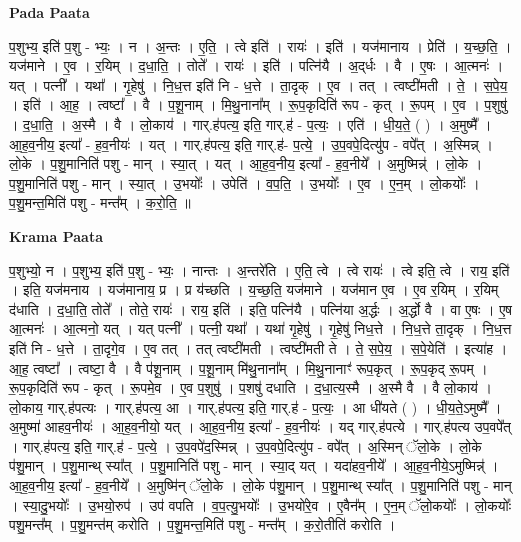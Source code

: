 \documentclass[17pt]{extarticle}
\begin{document}
\textbf{Pada Paata} \newline

प॒शुभ्य॒ इति॑ प॒शु - भ्यः॒ । न । अ॒न्तः । ए॒ति॒ । त्वे इति॑ । रायः॑ । इति॑ । यज॑मानाय । प्रेति॑ । य॒च्छ॒ति॒ । यज॑माने । ए॒व । र॒यिम् । द॒धा॒ति॒ । तोते᳚ । रायः॑ । इति॑ । पत्नि॑यै । अ॒द्‌र्धः । वै । ए॒षः । आ॒त्मनः॑ । यत् । पत्नी᳚ । यथा᳚ । गृ॒हेषु॑ । नि॒ध॒त्त इति॑ नि - ध॒त्ते । ता॒दृक् । ए॒व । तत् । त्वष्टी॑मती । ते॒ । स॒पे॒य॒ । इति॑ । आ॒ह॒ । त्वष्टा᳚ । वै । प॒शू॒नाम् । मि॒थु॒नाना᳚म् । रू॒प॒कृदिति॑ रूप - कृत् । रू॒पम् । ए॒व । प॒शुषु॑ । द॒धा॒ति॒ । अ॒स्मै । वै । लो॒काय॑ । गार्.ह॑पत्य॒ इति॒ गार्.ह॑ - प॒त्यः॒ । एति॑ । धी॒य॒ते॒ ( ) । अ॒मुष्मै᳚ । आ॒ह॒व॒नीय॒ इत्या᳚ - ह॒व॒नीयः॑ । यत् । गार्.ह॑पत्य॒ इति॒ गार्.ह॑- प॒त्ये॒ । उ॒प॒वपे॒दित्यु॑प - वपे᳚त् । अ॒स्मिन्न् । लो॒के । प॒शु॒मानिति॑ पशु - मान् । स्या॒त् । यत् । आ॒ह॒व॒नीय॒ इत्या᳚ - ह॒व॒नीये᳚ । अ॒मुष्मिन्न्॑ । लो॒के । प॒शु॒मानिति॑ पशु - मान् । स्या॒त् । उ॒भयोः᳚ । उपेति॑ । व॒प॒ति॒ । उ॒भयोः᳚ । ए॒व । ए॒न॒म् । लो॒कयोः᳚ । प॒शु॒मन्त॒मिति॑ पशु - मन्त᳚म् । क॒रो॒ति॒ ॥  \newline


\textbf{Krama Paata} \newline

प॒शुभ्यो॒ न । प॒शुभ्य॒ इति॑ प॒शु - भ्यः॒ । नान्तः । अ॒न्तरे॑ति । ए॒ति॒ त्वे । त्वे रायः॑ । त्वे इति॒ त्वे । राय॒ इति॑ । इति॒ यज॑मनाय । यज॑मानाय॒ प्र । प्र य॑च्छति । य॒च्छ॒ति॒ यज॑माने । यज॑मान ए॒व । ए॒व र॒यिम् । र॒यिम् द॑धाति । द॒धा॒ति॒ तोते᳚ । तोते॒ रायः॑ । राय॒ इति॑ । इति॒ पत्नि॑यै । पत्नि॑या अ॒र्द्धः । अ॒र्द्धो वै । वा ए॒षः । ए॒ष आ॒त्मनः॑ । आ॒त्मनो॒ यत् । यत् पत्नी᳚ । पत्नी॒ यथा᳚ । यथा॑ गृ॒हेषु॑ । गृ॒हेषु॑ निध॒त्ते । नि॒ध॒त्ते ता॒दृक् । नि॒ध॒त्त इति॑ नि - ध॒त्ते । ता॒दृगे॒व । ए॒व तत् । तत् त्वष्टी॑मती । त्वष्टी॑मती ते । ते॒ स॒पे॒य॒ । स॒पे॒येति॑ । इत्या॑ह । आ॒ह॒ त्वष्टा᳚ । त्वष्टा॒ वै । वै प॑शू॒नाम् । प॒शू॒नाम् मि॑थु॒नाना᳚म् । मि॒थु॒नानाꣳ॑ रूप॒कृत् । रू॒प॒कृद् रू॒पम् । रू॒प॒कृदिति॑ रूप - कृत् । रू॒पमे॒व । ए॒व प॒शुषु॑ । प॒शषु॑ दधाति । द॒धा॒त्य॒स्मै । अ॒स्मै वै । वै लो॒काय॑ । लो॒काय॒ गार्.ह॑पत्यः । गार्.ह॑पत्य॒ आ । गार्.ह॑पत्य॒ इति॒ गार्.ह॑ - प॒त्यः॒ । आ धी॑यते ( ) । धी॒य॒ते॒ऽमुष्मै᳚ । अ॒मुष्मा॑ आहव॒नीयः॑ । आ॒ह॒व॒नीयो॒ यत् । आ॒ह॒व॒नीय॒ इत्या᳚ - ह॒व॒नीयः॑ । यद् गार्.ह॑पत्ये । गार्.ह॑पत्य उप॒वपे᳚त् । गार्.ह॑पत्य॒ इति॒ गार्.ह॑ - प॒त्ये॒ । उ॒प॒वपे॑द॒स्मिन्न् । उ॒प॒वपे॒दित्यु॑प - वपे᳚त् । अ॒स्मिन् ॅलो॒के । लो॒के प॑शु॒मान् । प॒शु॒मान्थ् स्या᳚त् । प॒शु॒मानिति॑ पशु - मान् । स्या॒द् यत् । यदा॑हव॒नीये᳚ । आ॒ह॒व॒नीये॒ऽमुष्मिन्न्॑ । आ॒ह॒व॒नीय॒ इत्या᳚ - ह॒व॒नीये᳚ । अ॒मुष्मि॑न् ॅलो॒के । लो॒के प॑शु॒मान् । प॒शु॒मान्थ् स्या᳚त् । प॒शु॒मानिति॑ पशु - मान् । स्या॒दु॒भयोः᳚ । उ॒भयो॒रुप॑ । उप॑ वपति । व॒प॒त्यु॒भयोः᳚ । उ॒भयो॑रे॒व । ए॒वैन᳚म् । ए॒न॒म् ॅलो॒कयोः᳚ । लो॒कयोः᳚ पशु॒मन्त᳚म् । प॒शु॒मन्त॑म् करोति । प॒शु॒मन्त॒मिति॑ पशु - मन्त᳚म् । क॒रो॒तीति॑ करोति । \newline
\end{document}
